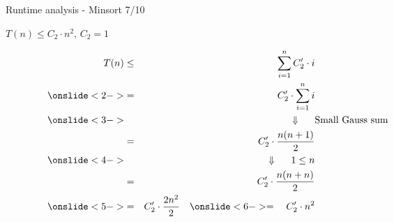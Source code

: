 \documentclass{beamer}
\begin{document}


\begin{frame}{Runtime analysis - Minsort 7/10}
  \begin{tabl}
    $\displaystyle  T(n) \leq C_2 \cdot n^2, \, C_2 = 1$
    \end{tabl}
\color{Mittel-Blau}
    \begin{eqnarray*}
        T(n) & \leq &           \sum \limits^{n} _{i = 1} C'_2\cdot i \\
        \onslide<2->
& = &           C'_2 \cdot \sum \limits^{n }_{i = 1} i\\
        \onslide<3-> & & { \color{black}\hspace*{1cm} \Downarrow \hspace*{0.5cm} \rlap{\text{Small Gauss sum}}}\\
& = &           C'_2 \cdot \frac{n(n + 1)}{2} \\
        \onslide<4-> & & { \color{black}\hspace*{1cm} \Downarrow
          \hspace*{0.5cm} 1 \leq n}\\
& = &           C'_2 \cdot \frac{n(n +n )}{2} \\
        \onslide<5->
& = &           C'_2 \cdot \frac{2n^2}{2}    \quad     \onslide<6->
=\quad C'_2 \cdot n^2
    \end{eqnarray*}

 \end{frame}
\end{document}
